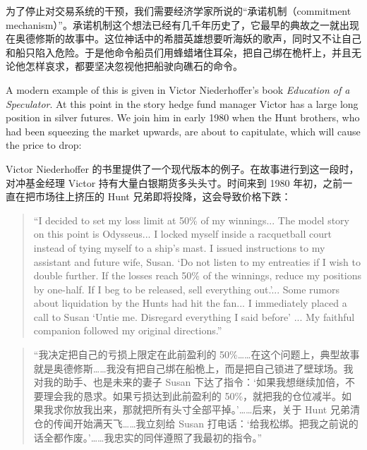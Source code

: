 \begin{chineseblock}为了停止对交易系统的干预，我们需要经济学家所说的“承诺机制（commitment mechanism）”。承诺机制这个想法已经有几千年历史了，它最早的典故之一就出现在奥德修斯的故事中。这位神话中的希腊英雄想要听海妖的歌声，同时又不让自己和船只陷入危险。于是他命令船员们用蜂蜡堵住耳朵，把自己绑在桅杆上，并且无论他怎样哀求，都要坚决忽视他把船驶向礁石的命令。\end{chineseblock}

\bipairgap

\begin{englishblock} A modern example of this is given in Victor Niederhoffer's book \textit{Education of a Speculator}. At this point in the story hedge fund manager Victor has a large long position in silver futures. We join him in early 1980 when the Hunt brothers, who had been squeezing the market upwards, are about to capitulate, which will cause the price to drop: \end{englishblock}

\begin{chineseblock} Victor Niederhoffer 的书里提供了一个现代版本的例子。在故事进行到这一段时，对冲基金经理 Victor 持有大量白银期货多头头寸。时间来到 1980 年初，之前一直在把市场往上挤压的 Hunt 兄弟即将投降，这会导致价格下跌：\end{chineseblock}

\begin{quote}
\begingroup\color{\englishbodycolorname} ``I decided to set my loss limit at 50\% of my winnings... The model story on this point is Odysseus... I locked myself inside a racquetball court instead of tying myself to a ship's mast. I issued instructions to my assistant and future wife, Susan. `Do not listen to my entreaties if I wish to double further. If the losses reach 50\% of the winnings, reduce my positions by one-half. If I beg to be released, sell everything out.'... Some rumors about liquidation by the Hunts had hit the fan... I immediately placed a call to Susan `Untie me. Disregard everything I said before' ... My faithful companion followed my original directions.'' \endgroup
\end{quote}

\begin{quote}
\begingroup\color{\chinesebodycolorname}“我决定把自己的亏损上限定在此前盈利的 50\%……在这个问题上，典型故事就是奥德修斯……我没有把自己绑在船桅上，而是把自己锁进了壁球场。我对我的助手、也是未来的妻子 Susan 下达了指令：‘如果我想继续加倍，不要理会我的恳求。如果亏损达到此前盈利的 50\%，就把我的仓位减半。如果我求你放我出来，那就把所有头寸全部平掉。’……后来，关于 Hunt 兄弟清仓的传闻开始满天飞……我立刻给 Susan 打电话：‘给我松绑。把我之前说的话全都作废。’……我忠实的同伴遵照了我最初的指令。”\endgroup
\end{quote}

